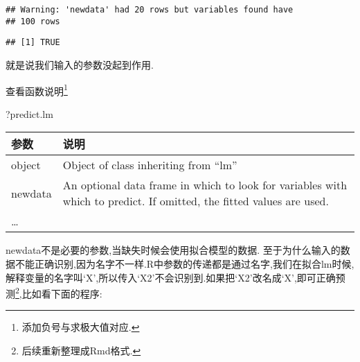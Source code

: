 \documentclass[]{ctexbook}
\newenvironment{Shaded}{\begin{snugshade}}{\end{snugshade}}
\newcommand{\NormalTok}[1]{#1}
\begin{document}
\begin{verbatim}
## Warning: 'newdata' had 20 rows but variables found have
## 100 rows
\end{verbatim}

\begin{verbatim}
## [1] TRUE
\end{verbatim}

就是说我们输入的参数没起到作用.

查看函数说明\footnote{添加负号与求极大值对应.}

\begin{Shaded}
\begin{Highlighting}[]
\NormalTok{?predict.lm}
\end{Highlighting}
\end{Shaded}

\begin{longtable}[]{@{}ll@{}}
\toprule
\begin{minipage}[b]{0.13\columnwidth}\raggedright
参数\strut
\end{minipage} & \begin{minipage}[b]{0.81\columnwidth}\raggedright
说明\strut
\end{minipage}\tabularnewline
\midrule
\endhead
\begin{minipage}[t]{0.13\columnwidth}\raggedright
object\strut
\end{minipage} & \begin{minipage}[t]{0.81\columnwidth}\raggedright
Object of class inheriting from ``lm''\strut
\end{minipage}\tabularnewline
\begin{minipage}[t]{0.13\columnwidth}\raggedright
newdata\strut
\end{minipage} & \begin{minipage}[t]{0.81\columnwidth}\raggedright
An optional data frame in which to look for variables with which to predict. If omitted, the fitted values are used.\strut
\end{minipage}\tabularnewline
\begin{minipage}[t]{0.13\columnwidth}\raggedright
\ldots{}\strut
\end{minipage} & \begin{minipage}[t]{0.81\columnwidth}\raggedright
\strut
\end{minipage}\tabularnewline
\bottomrule
\end{longtable}

newdata不是必要的参数,当缺失时候会使用拟合模型的数据.
至于为什么输入的数据不能正确识别,因为名字不一样.R中参数的传递都是通过名字,我们在拟合lm时候,解释变量的名字叫`X',所以传入`X2'不会识别到.如果把`X2'改名成`X',即可正确预测\footnote{后续重新整理成Rmd格式.},比如看下面的程序:
\end{document}
